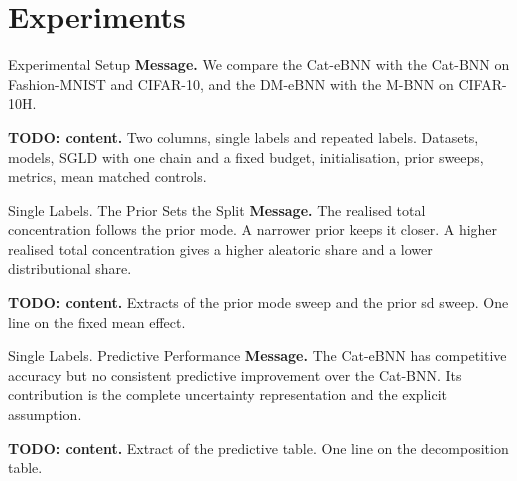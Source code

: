 
\section{Experiments}

\begin{frame}{Experimental Setup}
	\textbf{Message.} We compare the Cat-eBNN with the Cat-BNN on Fashion-MNIST and CIFAR-10, and the DM-eBNN with the M-BNN on CIFAR-10H.

	\medskip
	\textbf{TODO: content.} Two columns, single labels and repeated labels. Datasets, models, SGLD with one chain and a fixed budget, initialisation, prior sweeps, metrics, mean matched controls.
\end{frame}

\begin{frame}{Single Labels. The Prior Sets the Split}
	\textbf{Message.} The realised total concentration follows the prior mode. A narrower prior keeps it closer. A higher realised total concentration gives a higher aleatoric share and a lower distributional share.

	\medskip
	\textbf{TODO: content.} Extracts of the prior mode sweep and the prior sd sweep. One line on the fixed mean effect.
\end{frame}

\begin{frame}{Single Labels. Predictive Performance}
	\textbf{Message.} The Cat-eBNN has competitive accuracy but no consistent predictive improvement over the Cat-BNN. Its contribution is the complete uncertainty representation and the explicit assumption.

	\medskip
	\textbf{TODO: content.} Extract of the predictive table. One line on the decomposition table.
\end{frame}

